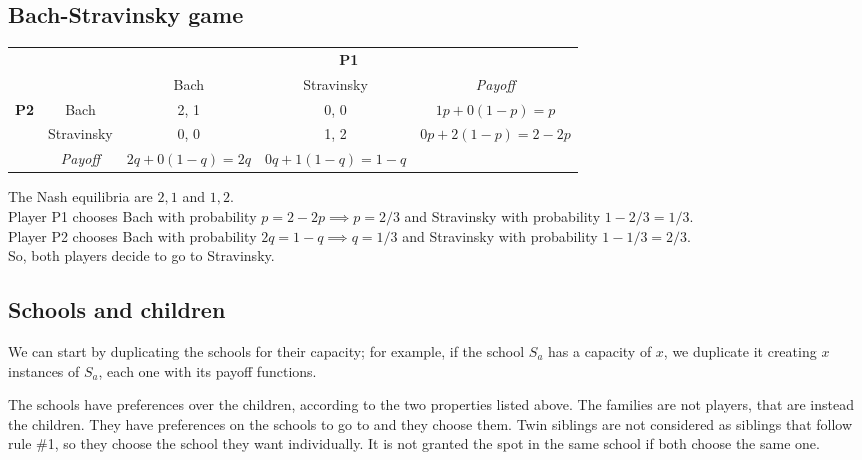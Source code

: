 \documentclass{article}
\begin{document}
\subsection{Bach-Stravinsky game}
\begin{center}
\begin{tabular}{ccccc}
                                                        &                                      & \multicolumn{3}{c}{\textbf{P1}}                                                                             \\ \cline{3-5} 
                                                        & \multicolumn{1}{c|}{}                & \multicolumn{1}{c|}{Bach}           & \multicolumn{1}{c|}{Stravinsky}      & \multicolumn{1}{c|}{\textit{Payoff}} \\ \cline{2-5} 
\multicolumn{1}{c|}{\multirow{3}{*}{\textbf{P2}}} & \multicolumn{1}{c|}{Bach}            & \multicolumn{1}{c|}{2, 1}           & \multicolumn{1}{c|}{0, 0}            & \multicolumn{1}{c|}{$1p+0(1-p)=p$}  \\ \cline{2-5} 
\multicolumn{1}{c|}{}                                   & \multicolumn{1}{c|}{Stravinsky}      & \multicolumn{1}{c|}{0, 0}           & \multicolumn{1}{c|}{1, 2}            & \multicolumn{1}{c|}{$0p+2(1-p)=2-2p$} \\ \cline{2-5} 
\multicolumn{1}{c|}{}                                   & \multicolumn{1}{c|}{\textit{Payoff}} & \multicolumn{1}{c|}{$2q+0(1-q)=2q$} & \multicolumn{1}{c|}{$0q+1(1-q)=1-q$} & \multicolumn{1}{c|}{}                \\ \cline{2-5} 
\end{tabular}
\end{center}
The Nash equilibria are $2,1$ and $1,2$.\\
Player P1 chooses Bach with probability $p=2-2p \implies p=2/3$ and Stravinsky with probability $1-2/3=1/3$.\\
Player P2 chooses Bach with probability $2q=1-q \implies q=1/3$ and Stravinsky with probability $1-1/3=2/3$.\\
So, both players decide to go to Stravinsky.

\subsection{Schools and children}
We can start by duplicating the schools for their capacity; for example, if the school $S_a$ has a capacity of $x$, we duplicate it creating $x$ instances of $S_a$, each one with its payoff functions.

The schools have preferences over the children, according to the two properties listed above.
The families are not players, that are instead the children. They have preferences on the schools to go to and they choose them.
Twin siblings are not considered as siblings that follow rule \#1, so they choose the school they want individually. It is not granted the spot in the same school if both choose the same one.
\end{document}
